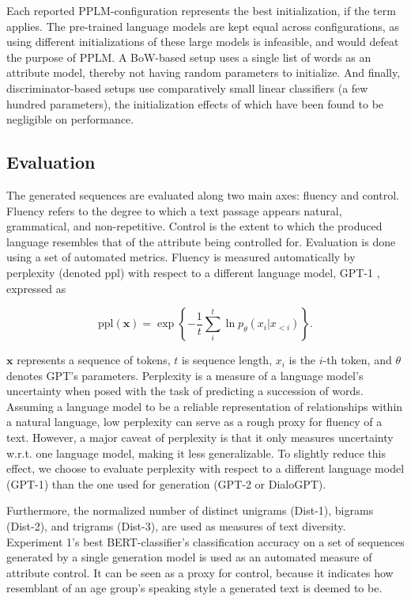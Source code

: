 Each reported PPLM-configuration represents the best initialization, if the term applies. The pre-trained language models are kept equal across configurations, as using different initializations of these large models is infeasible, and would defeat the purpose of PPLM. A BoW-based setup uses a single list of words as an attribute model, thereby not having random parameters to initialize. And finally, discriminator-based setups use comparatively small linear classifiers (a few hundred parameters), the initialization effects of which have been found to be negligible on performance.

\subsection{Evaluation}

The generated sequences are evaluated along two main axes: fluency and control. Fluency refers to the degree to which a text passage appears natural, grammatical, and non-repetitive. Control is the extent to which the produced language resembles that of the attribute being controlled for. Evaluation is done using a set of automated metrics. Fluency is measured automatically by perplexity (denoted ppl) with respect to a different language model, GPT-1 \citep{radford2018improving}, expressed as

\begin{equation}
    \text{ppl}(\textbf{x}) = \exp \left\{ - \frac{1}{t} \sum_{i}^t \ln p_{\theta}(x_i | x_{<i})\right\}.    
\end{equation}

$\textbf{x}$ represents a sequence of tokens, $t$ is sequence length, $x_i$ is the $i$-th token, and $\theta$ denotes GPT's parameters. Perplexity is a measure of a language model's uncertainty when posed with the task of predicting a succession of words. Assuming a language model to be a reliable representation of relationships within a natural language, low perplexity can serve as a rough proxy for fluency of a text. However, a major caveat of perplexity is that it only measures uncertainty w.r.t. one language model, making it less generalizable. To slightly reduce this effect, we choose to evaluate perplexity with respect to a different language model (GPT-1) than the one used for generation (GPT-2 or DialoGPT).

Furthermore, the normalized number of distinct unigrams (Dist-1), bigrams (Dist-2), and trigrams (Dist-3), are used as measures of text diversity. Experiment 1's best BERT-classifier's classification accuracy on a set of sequences generated by a single generation model is used as an automated measure of attribute control. It can be seen as a proxy for control, because it indicates how resemblant of an age group's speaking style a generated text is deemed to be.

